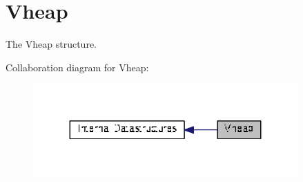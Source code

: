 \hypertarget{group__vheap}{\section{Vheap}
\label{group__vheap}
}


The Vheap structure.  


Collaboration diagram for Vheap\+:
\nopagebreak
\begin{figure}[H]
\begin{center}
\leavevmode
\includegraphics[width=287pt]{group__vheap}
\end{center}
\end{figure}
